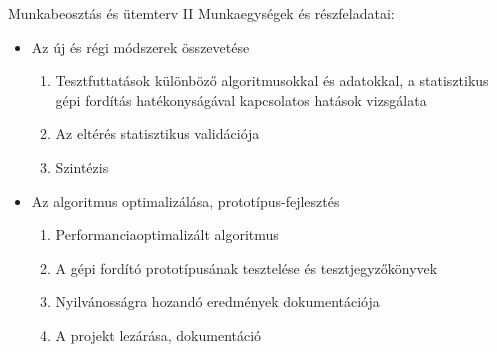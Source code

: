 \begin{frame}{Munkabeosztás és ütemterv II}
Munkaegységek és részfeladatai:
\begin{itemize}
  \item<1-> {
    Az új és régi módszerek összevetése
    \begin{enumerate}
        \item Tesztfuttatások különböző algoritmusokkal és adatokkal, a statisztikus gépi fordítás hatékonyságával kapcsolatos hatások vizsgálata
        \item Az eltérés statisztikus validációja
        \item Szintézis
    \end{enumerate}
  }
  \item<2-> {
    Az algoritmus optimalizálása, prototípus-fejlesztés
    \begin{enumerate}
        \item Performanciaoptimalizált algoritmus
        \item A gépi fordító prototípusának tesztelése és tesztjegyzőkönyvek
        \item Nyilvánosságra hozandó eredmények dokumentációja
        \item A projekt lezárása, dokumentáció
    \end{enumerate}
  }
  \end{itemize}
\end{frame}

    
